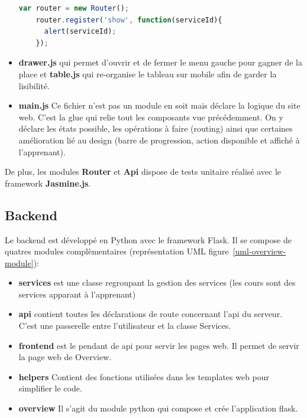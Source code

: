 \documentclass[a4paper,11pt]{report}
\begin{document}
\begin{itemize}
\begin{lstlisting}[language=javascript,caption={Affichage identifiant avec le routeur}]
    var router = new Router();
    router.register('show', function(serviceId){
      alert(serviceId);
    });
    \end{lstlisting}
  \item \textbf{drawer.js} qui permet d'ouvrir et de fermer le menu gauche pour gagner de la place et \textbf{table.js} qui re-organise le tableau sur mobile afin de garder la lisibilité.
  \item \textbf{main.js} Ce fichier n'est pas un module en soit mais déclare la logique du site web. C'est la glue qui relie tout les composants vue précédemment. On y déclare les états possible, les opérations à faire (routing) ainsi que certaines amélioration lié au design (barre de progression, action disponible et affiché à l'apprenant).
\end{itemize}

De plus, les modules \textbf{Router} et \textbf{Api} dispose de tests unitaire réalisé avec le framework \textbf{Jasmine.js}.

\subsection{Backend}

Le backend est développé en Python avec le framework Flask. Il se compose de quatres modules complèmentaires (représentation UML figure~\ref{uml-overview-module}):

\begin{itemize}
  \item \textbf{services} est une classe regroupant la gestion des services (les cours sont des services apparant à l'apprenant)
  \item \textbf{api} contient toutes les déclarations de route concernant l'api du serveur. C'est une passerelle entre l'utilisateur et la classe Services.
  \item \textbf{frontend} est le pendant de api pour servir les pages web. Il permet de servir la page web de Overview.
  \item \textbf{helpers} Contient des fonctions utilisées dans les templates web pour simplifier le code.
  \item \textbf{overview} Il s'agit du module python qui compose et crée l'application flask.
\end{itemize}
\end{document}
